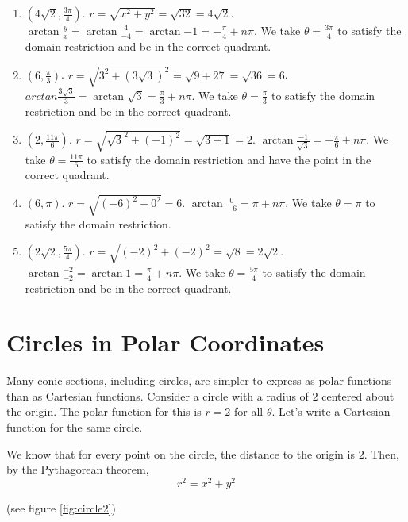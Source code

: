 \begin{Answer}[ref = convert2]
\begin{enumerate}
\item $(4\sqrt{2}, \frac{3\pi}{4})$. $r = \sqrt{x^2 + y^2} = \sqrt{32} = 4
\sqrt{2}$. $\arctan{\frac{y}{x}} = \arctan{\frac{4}{-4}} = \arctan{-1} = -
\frac{\pi}{4} + n\pi$. We take $\theta = \frac{3\pi}{4}$ to satisfy the domain 
restriction and be in the correct quadrant. 
\item $(6, \frac{\pi}{3})$. $r = \sqrt{3^2 + \left( 3\sqrt{3} \right)^2} = 
\sqrt{9 + 27} = \sqrt{36} = 6$. $arctan{\frac{3\sqrt{3}}{3}} = \arctan{\sqrt{
3}} = \frac{\pi}{3} + n\pi$. We take $\theta = \frac{\pi}{3}$ to satisfy the 
domain restriction and be in the correct quadrant. 
\item $(2,\frac{11\pi}{6})$. $r = \sqrt{\sqrt{3}^2 + (-1)^2} = \sqrt{3 + 1} = 
2$. $\arctan{\frac{-1}{\sqrt{3}}} = -\frac{\pi}{6} + n\pi$. We take $\theta = 
\frac{11\pi}{6}$ to satisfy the domain restriction and have the point in the 
correct quadrant. 
\item $(6, \pi)$. $r = \sqrt{(-6)^2 + 0^2} = 6$. $\arctan{\frac{0}{-6}} = \pi 
+ n\pi$. We take $\theta = \pi$ to satisfy the domain restriction. 
\item $(2\sqrt{2}, \frac{5\pi}{4})$. $r = \sqrt{(-2)^2 + (-2)^2} = \sqrt{8} = 
2\sqrt{2}$. $\arctan{\frac{-2}{-2}} = \arctan{1} = \frac{\pi}{4} + n\pi$. We 
take $\theta = \frac{5\pi}{4}$ to satisfy the domain restriction and be in the 
correct quadrant. 
\end{enumerate}
\end{Answer}



\section{Circles in Polar Coordinates}
Many conic sections, including circles, are simpler to express as polar 
functions than as Cartesian functions. Consider a circle with a radius of $2$ 
centered about the origin. The polar function for this is $r = 2$ for all 
$\theta$. Let's write a Cartesian function for the same circle. 

We know that for every point on the circle, the distance to the origin is $2$. 
Then, by the Pythagorean theorem, 
$$r^2 = x^2 + y^2$$

(see figure \ref{fig:circle2})

